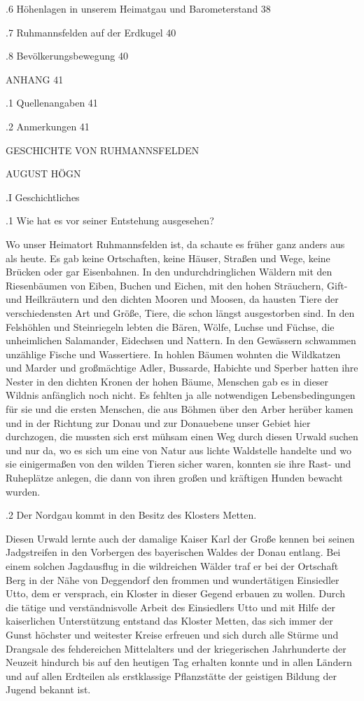 .6 Höhenlagen in unserem Heimatgau und Barometerstand   38

.7 Ruhmannsfelden auf der Erdkugel  40

.8 Bevölkerungsbewegung 40

ANHANG  41

.1 Quellenangaben   41

.2 Anmerkungen  41



 GESCHICHTE VON RUHMANNSFELDEN

AUGUST HÖGN

.I Geschichtliches

.1 Wie hat es vor seiner Entstehung ausgesehen?

Wo unser Heimatort Ruhmannsfelden ist, da schaute es früher ganz anders aus als
heute. Es gab keine Ortschaften, keine Häuser, Straßen und Wege, keine Brücken
oder gar Eisenbahnen. In den undurchdringlichen Wäldern mit den Riesenbäumen von
Eiben, Buchen und Eichen, mit den hohen Sträuchern, Gift- und Heilkräutern und
den dichten Mooren und Moosen, da hausten Tiere der verschiedensten Art und
Größe, Tiere, die schon längst ausgestorben sind. In den Felshöhlen und
Steinriegeln lebten die Bären, Wölfe, Luchse und Füchse, die unheimlichen
Salamander, Eidechsen und Nattern. In den Gewässern schwammen unzählige Fische
und Wassertiere. In hohlen Bäumen wohnten die Wildkatzen und Marder und
großmächtige Adler, Bussarde, Habichte und Sperber hatten ihre Nester in den
dichten Kronen der hohen Bäume, Menschen gab es in dieser Wildnis anfänglich
noch nicht. Es fehlten ja alle notwendigen Lebensbedingungen für sie und die
ersten Menschen, die aus Böhmen über den Arber herüber kamen und in der Richtung
zur Donau und zur Donauebene unser Gebiet hier durchzogen, die mussten sich erst
mühsam einen Weg durch diesen Urwald suchen und nur da, wo es sich um eine von
Natur aus lichte Waldstelle handelte und wo sie einigermaßen von den wilden
Tieren sicher waren, konnten sie ihre Rast- und Ruheplätze anlegen, die dann von
ihren großen und kräftigen Hunden bewacht wurden.

.2 Der Nordgau kommt in den Besitz des Klosters Metten.

Diesen Urwald lernte auch der damalige Kaiser Karl der Große kennen bei seinen
Jadgstreifen in den Vorbergen des bayerischen Waldes der Donau entlang. Bei
einem solchen Jagdausflug in die wildreichen Wälder traf er bei der Ortschaft
Berg in der Nähe von Deggendorf den frommen und wundertätigen Einsiedler Utto,
dem er versprach, ein Kloster in dieser Gegend erbauen zu wollen. Durch die
tätige und verständnisvolle Arbeit des Einsiedlers Utto und mit Hilfe der
kaiserlichen Unterstützung entstand das Kloster Metten, das sich immer der Gunst
höchster und weitester Kreise erfreuen und sich durch alle Stürme und Drangsale
des fehdereichen Mittelalters und der kriegerischen Jahrhunderte der Neuzeit
hindurch bis auf den heutigen Tag erhalten konnte und in allen Ländern und auf
allen Erdteilen als erstklassige Pflanzstätte der geistigen Bildung der Jugend
bekannt ist.

